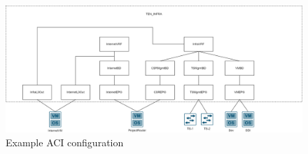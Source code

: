 \begin{figure}[H]
    \centering
    \includegraphics[width=1\linewidth]{images/epg-topology.png}
    \caption{Example ACI configuration}
    \label{fig:example-aci}
\end{figure}

